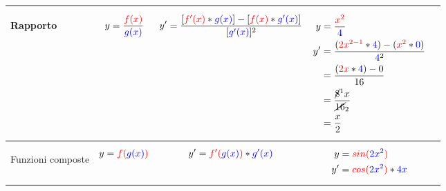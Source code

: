 \documentclass[10pt, a4paper]{article}
\begin{document}
\begin{center}
{\begin{tabular}{ |p{5em} | p{5em} | p{5em} | p{7em} | p{2cm}| }
                \hline
                
                \begin{center}
                    Rapporto
                \end{center} &
                \begin{align}
                    y= \frac{\color{red}f(x)}{\color{blue}g(x)} \nonumber
                \end{align}  &
                \begin{align}
                    y'= \frac{[{\color{red}f'(x)} * {\color{blue}g(x)} ] - [ {\color{red}f(x)} * {\color{blue}g'(x)}]}{[{\color{blue}g'(x)}]^2} \nonumber
                \end{align} &
                {
                    \begin{align}
                        y  &= \frac{\color{red}x^2}{\color{blue}4}   \nonumber \\
                        y' &= \frac{( {\color{red}2x^{2-1}} * {\color{blue}4} ) - ( {\color{red}x^2} * {\color{blue}0} )}{{\color{blue}4}^2} \nonumber \\
                           &= \frac{({\color{red}2x} * {\color{blue}4}) - 0}{16} \nonumber \\
                           &= \frac{\cancel{8}^1x}{\cancel{16}_2} \nonumber  \\
                           &= \frac{x}{2} \nonumber
                    \end{align}
                } &
                \begin{center}
                \end{center} \\ 

                \hline
                
                \begin{center}
                    Funzioni composte
                \end{center} &
                \begin{align}
                    y= {\color{red}f({\color{blue}g(x)})} \nonumber
                \end{align}  &
                \begin{align}
                    y'= {\color{red}f'({\color{blue}g(x)})} * {\color{blue}g'(x)} \nonumber
                \end{align} &
                {
                    \begin{align}
                        y  &= {\color{red}sin({\color{blue}2x^2})}   \nonumber \\
                        y' &= {\color{red}cos({\color{blue}2x^2})} * {\color{blue}4x} \nonumber 
                    \end{align}
                } &
                \begin{center}
                \end{center} \\ 


\end{tabular}}
\end{center}
\end{document}
